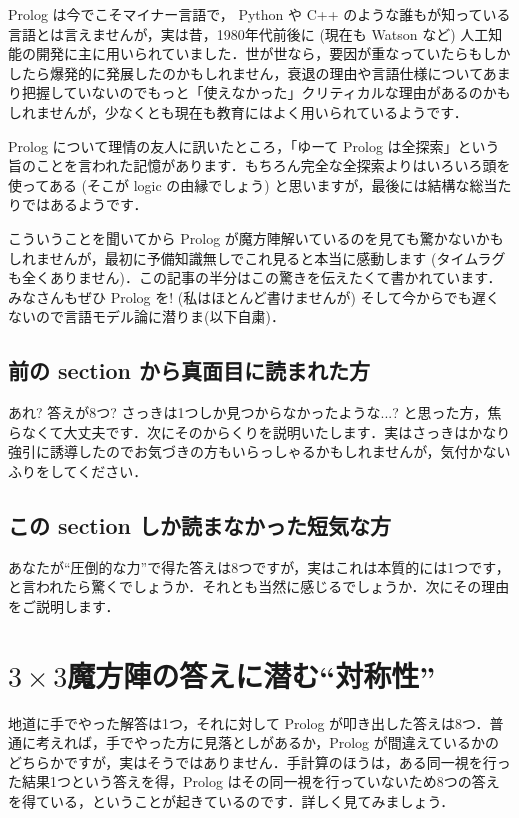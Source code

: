\documentclass[11pt]{jsarticle}
\begin{document}
Prolog は今でこそマイナー言語で， Python や C++ のような誰もが知っている言語とは言えませんが，実は昔，1980年代前後に (現在も Watson など) 人工知能の開発に主に用いられていました．世が世なら，要因が重なっていたらもしかしたら爆発的に発展したのかもしれません，衰退の理由や言語仕様についてあまり把握していないのでもっと「使えなかった」クリティカルな理由があるのかもしれませんが，少なくとも現在も教育にはよく用いられているようです．

Prolog について理情の友人に訊いたところ，「ゆーて Prolog は全探索」という旨のことを言われた記憶があります．もちろん完全な全探索よりはいろいろ頭を使ってある (そこが logic の由縁でしょう) と思いますが，最後には結構な総当たりではあるようです．

こういうことを聞いてから Prolog が魔方陣解いているのを見ても驚かないかもしれませんが，最初に予備知識無しでこれ見ると本当に感動します (タイムラグも全くありません)．この記事の半分はこの驚きを伝えたくて書かれています．みなさんもぜひ Prolog を! (私はほとんど書けませんが) そして今からでも遅くないので言語モデル論に潜りま(以下自粛)．

\subsection{前の section から真面目に読まれた方}
あれ? 答えが8つ? さっきは1つしか見つからなかったような...? と思った方，焦らなくて大丈夫です．次にそのからくりを説明いたします．実はさっきはかなり強引に誘導したのでお気づきの方もいらっしゃるかもしれませんが，気付かないふりをしてください．

\subsection{この section しか読まなかった短気な方}
あなたが``圧倒的な力''で得た答えは8つですが，実はこれは本質的には1つです，と言われたら驚くでしょうか．それとも当然に感じるでしょうか．次にその理由をご説明します．

\section{$3\times 3$魔方陣の答えに潜む``対称性''}
地道に手でやった解答は1つ，それに対して Prolog が叩き出した答えは8つ．普通に考えれば，手でやった方に見落としがあるか，Prolog が間違えているかのどちらかですが，実はそうではありません．手計算のほうは，ある同一視を行った結果1つという答えを得，Prolog はその同一視を行っていないため8つの答えを得ている，ということが起きているのです．詳しく見てみましょう．
\end{document}
